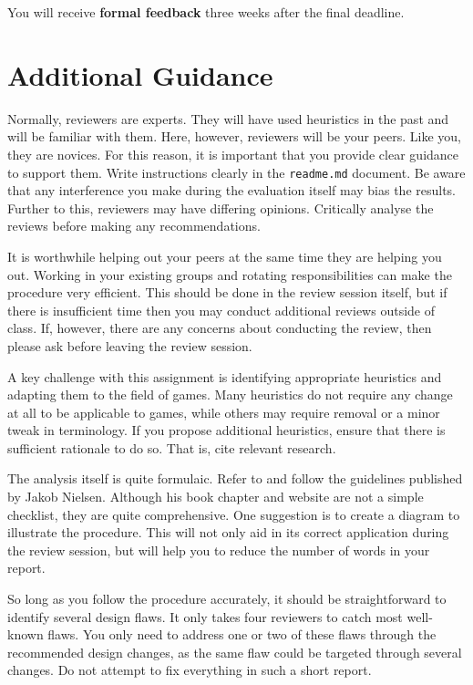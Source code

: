 \documentclass{../fal_assignment}
\begin{document}
You will receive \textbf{formal feedback} three weeks after the final deadline.

\section*{Additional Guidance}

Normally, reviewers are experts. They will have used heuristics in the past and will be familiar with them. Here, however, reviewers will be your peers. Like you, they are novices. For this reason, it is important that you provide clear guidance to support them. Write instructions clearly in the \texttt{readme.md} document. Be aware that any interference you make during the evaluation itself may bias the results. Further to this, reviewers may have differing opinions. Critically analyse the reviews before making any recommendations.

It is worthwhile helping out your peers at the same time they are helping you out. Working in your existing groups and rotating responsibilities can make the procedure very efficient. This should be done in the review session itself, but if there is insufficient time then you may conduct additional reviews outside of class. If, however, there are any concerns about conducting the review, then please ask before leaving the review session.

A key challenge with this assignment is identifying appropriate heuristics and adapting them to the field of games. Many heuristics do not require any change at all to be applicable to games, while others may require removal or a minor tweak in terminology. If you propose additional heuristics, ensure that there is sufficient rationale to do so. That is, cite relevant research.

The analysis itself is quite formulaic. Refer to and follow the guidelines published by Jakob Nielsen. Although his book chapter and website are not a simple checklist, they are quite comprehensive. One suggestion is to create a diagram to illustrate the procedure. This will not only aid in its correct application during the review session, but will help you to reduce the number of words in your report. 

So long as you follow the procedure accurately, it should be straightforward to identify several design flaws. It only takes four reviewers to catch most well-known flaws. You only need to address one or two of these flaws through the recommended design changes, as the same flaw could be targeted through several changes. Do not attempt to fix everything in such a short report.
\end{document}
